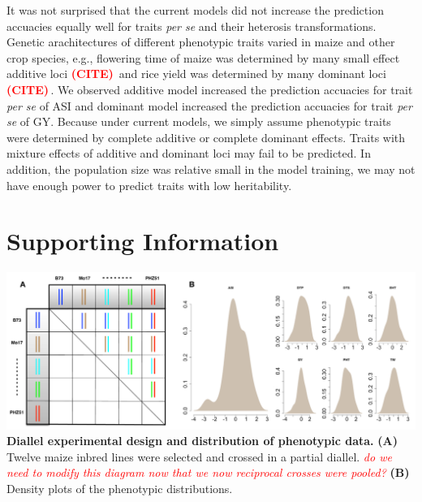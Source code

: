 \documentclass[9pt,twocolumn,twoside]{gsajnl}
\newcommand{\citex}{\textcolor{red}{\bf (CITE)\,}}
\newcommand{\jri}[1]{\textcolor{red}{ \emph{ #1}} }
\begin{document}
It was not surprised that the current models did not increase the prediction accuacies equally well for traits \emph{per se} and their heterosis transformations. Genetic arachitectures of different phenotypic traits varied in maize and other crop species, e.g., flowering time of maize was determined by many small effect additive loci \citex{} and rice yield was determined by many dominant loci \citex{}. We observed additive model increased the prediction accuacies for trait \emph{per se} of ASI and dominant model increased the prediction accuacies for trait \emph{per se} of GY. Because under current models, we simply assume phenotypic traits were determined by complete additive or complete dominant effects. Traits with mixture effects of additive and dominant loci may fail to be predicted. In addition, the population size was relative small in the model training, we may not have enough power to predict traits with low heritability. 






\clearpage




\onecolumn
\pagebreak
\beginsupplement

\section*{Supporting Information}

\begin{center}\vspace{1cm}

\includegraphics[width=0.8\linewidth]{SFig_pvp.pdf}
{\color{black} \textbf{Diallel experimental design and distribution of phenotypic data.}
\textbf{(A)} Twelve maize inbred lines were selected and crossed in a partial diallel. \jri{do we need to modify this diagram now that we now reciprocal crosses were pooled?} \textbf{(B)} Density plots of the phenotypic distributions.
}
\label{fig:pvp-pheno}
\end{center}\vspace{1cm}
\end{document}
